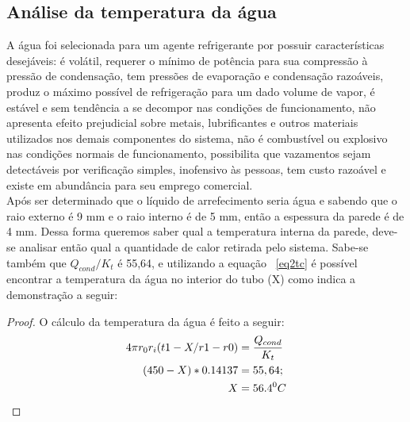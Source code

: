 \subsection{Análise da temperatura da água}
A água foi selecionada para um agente refrigerante por possuir características desejáveis: é volátil, requerer o mínimo de potência para sua compressão à pressão de condensação, tem pressões de evaporação e condensação razoáveis, produz o máximo possível de refrigeração para um dado volume de vapor, é estável e sem tendência a se decompor nas condições de funcionamento, não apresenta efeito prejudicial sobre metais, lubrificantes e outros materiais utilizados nos demais componentes do sistema, não é combustível ou explosivo nas condições normais de funcionamento, possibilita que vazamentos sejam detectáveis por verificação simples, inofensivo às pessoas,  tem custo razoável e existe em abundância para seu emprego comercial.\\
Após ser determinado que o líquido de arrefecimento seria água e sabendo que o raio externo é 9 mm e o raio interno é de 5 mm, então a espessura da parede é de 4 mm. Dessa forma queremos saber qual a temperatura interna da parede, deve-se analisar então qual a quantidade de calor  retirada pelo sistema. Sabe-se também que $Q_{cond}/K_t$ é 55,64, e utilizando a equação ~\ref{eq2tc} é possível encontrar a temperatura da água no interior do tubo (X) como indica a demonstração a seguir:
\begin{proof} O cálculo da temperatura da água é feito a seguir: 
	\begin{equation}\label{eqAtc}
	\begin{split}
	4\pi r_0r_i(t1-X/r1-r0)&=\frac{Q_{cond}}{K_t}\\
	(450 - X) * 0.14137&=55,64;\\
	X &= 56.4^0C \qedhere
	\end{split}	
	\end{equation}
\end{proof}

